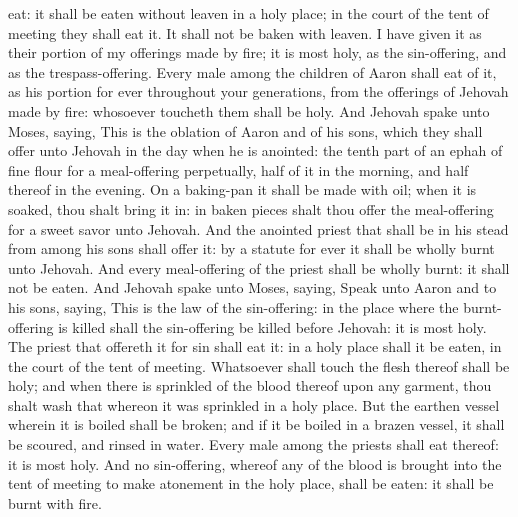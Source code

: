 eat: it shall be eaten without leaven in a holy place; in the court of the tent of meeting they shall eat it. It shall not be baken with leaven. I have given it as their portion of my offerings made by fire; it is most holy, as the sin-offering, and as the trespass-offering. Every male among the children of Aaron shall eat of it, as his portion for ever throughout your generations, from the offerings of Jehovah made by fire: whosoever toucheth them shall be holy.  And Jehovah spake unto Moses, saying, This is the oblation of Aaron and of his sons, which they shall offer unto Jehovah in the day when he is anointed: the tenth part of an ephah of fine flour for a meal-offering perpetually, half of it in the morning, and half thereof in the evening. On a baking-pan it shall be made with oil; when it is soaked, thou shalt bring it in: in baken pieces shalt thou offer the meal-offering for a sweet savor unto Jehovah. And the anointed priest that shall be in his stead from among his sons shall offer it: by a statute for ever it shall be wholly burnt unto Jehovah. And every meal-offering of the priest shall be wholly burnt: it shall not be eaten.  And Jehovah spake unto Moses, saying, Speak unto Aaron and to his sons, saying, This is the law of the sin-offering: in the place where the burnt-offering is killed shall the sin-offering be killed before Jehovah: it is most holy. The priest that offereth it for sin shall eat it: in a holy place shall it be eaten, in the court of the tent of meeting. Whatsoever shall touch the flesh thereof shall be holy; and when there is sprinkled of the blood thereof upon any garment, thou shalt wash that whereon it was sprinkled in a holy place. But the earthen vessel wherein it is boiled shall be broken; and if it be boiled in a brazen vessel, it shall be scoured, and rinsed in water. Every male among the priests shall eat thereof: it is most holy. And no sin-offering, whereof any of the blood is brought into the tent of meeting to make atonement in the holy place, shall be eaten: it shall be burnt with fire. 

